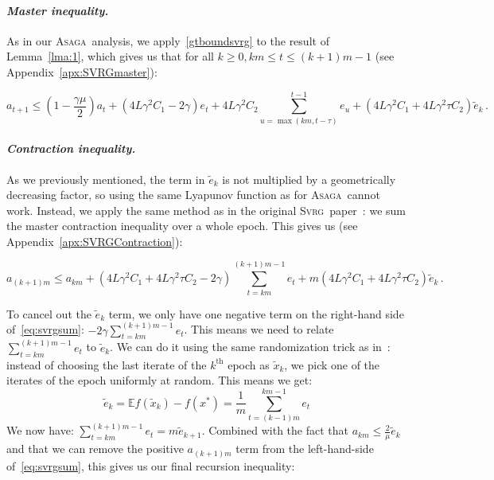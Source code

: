 \documentclass[twoside, 11pt]{article}
\newcommand{\stepsize}{\gamma}
\newcommand{\strongconvex}{\mu}
\newcommand{\overlap}{\tau}
\newcommand{\lipschitz}{L}
\newcommand{\E}{\mathbb{E}}
\newcommand{\ASAGA}{\textsc{Asaga}}
\newcommand{\SVRG}{\textsc{Svrg}}
\begin{document}
\paragraph{\textit{Master inequality.}}
As in our \ASAGA\ analysis, we apply~\eqref{gtboundsvrg} to the result of Lemma~\ref{lma:1}, which gives us that for all $k \geq 0, km\leq  t \leq (k+1)m -1$ (see Appendix~\ref{apx:SVRGmaster}):

\begin{equation}\label{eq:masterSVRG}
a_{t+1}
\leq (1 - \frac{\stepsize\strongconvex}{2})a_t
+ (4\lipschitz \stepsize^2 C_1 -2\stepsize) e_t
+ 4\lipschitz \stepsize^2 C_2 \sum_{u = \max(km, t-\overlap)}^{t-1} e_u
+ (4\lipschitz \stepsize^2 C_1 + 4 \lipschitz \stepsize^2\overlap C_2) \tilde e_k\,.
\end{equation}

\paragraph{\textit{Contraction inequality.}}
As we previously mentioned, the term in $\tilde e_k$ is not multiplied by a geometrically decreasing factor, so using the same Lyapunov function as for \ASAGA\ cannot work.
Instead, we apply the same method as in the original \SVRG\ paper~\citep{svrg}: we sum the master contraction inequality over a whole epoch.
This gives us (see Appendix~\ref{apx:SVRGContraction}):

\begin{equation}\label{eq:svrgsum}
a_{(k+1)m} \leq a_{km}
+ (4\lipschitz \stepsize^2 C_1 + 4\lipschitz \stepsize^2 \overlap C_2 -2\stepsize) \sum_{t=km}^{(k+1)m-1} e_t
+ m (4\lipschitz \stepsize^2 C_1 + 4 \lipschitz \stepsize^2\overlap C_2) \tilde e_k \,.
\end{equation}

To cancel out the $\tilde e_k$ term, we only have one negative term on the right-hand side of~\eqref{eq:svrgsum}: $-2 \stepsize \sum_{t=km}^{(k+1)m-1} e_t$.
This means we need to relate $\sum_{t=km}^{(k+1)m-1} e_t$ to $\tilde e_k$.
We can do it using the same randomization trick as in~\citet{svrg}: instead of choosing the last iterate of the $k^\mathrm{th}$ epoch as $\tilde x_k$, we pick one of the iterates of the epoch uniformly at random.
This means we get:
\begin{equation}\label{eq:randomtrick}
\tilde e_k = \E f(\tilde x_k) - f(x^*) = \frac{1}{m} \sum_{t=(k-1)m}^{km-1} e_t
\end{equation}
We now have: $\sum_{t=km}^{(k+1)m-1} e_t = m \tilde e_{k+1}$.
Combined with the fact that $a_{km} \leq \frac{2}{\strongconvex} \tilde e_k$ and that we can remove the positive $a_{(k+1)m}$ term from the left-hand-side of~\eqref{eq:svrgsum}, this gives us our final recursion inequality:
\end{document}
